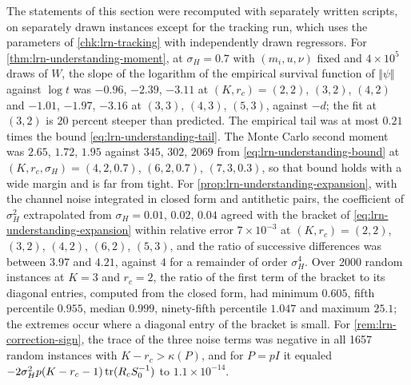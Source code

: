 \begin{numcheck}\label{chk:lrn-independent}
The statements of this section were recomputed with separately written scripts, on separately drawn instances except for the tracking run, which uses the parameters of \cref{chk:lrn-tracking} with independently drawn regressors. For \cref{thm:lrn-understanding-moment}, at $\sigma_H=0.7$ with $(m_i,u,\nu)$ fixed and $4\times10^5$ draws of $W$, the slope of the logarithm of the empirical survival function of $\Vert\psi\Vert$ against $\log t$ was $-0.96$, $-2.39$, $-3.11$ at $(K,r_c)=(2,2)$, $(3,2)$, $(4,2)$ and $-1.01$, $-1.97$, $-3.16$ at $(3,3)$, $(4,3)$, $(5,3)$, against $-d$; the fit at $(3,2)$ is $20$ percent steeper than predicted. The empirical tail was at most $0.21$ times the bound \cref{eq:lrn-understanding-tail}. The Monte Carlo second moment was $2.65$, $1.72$, $1.95$ against $345$, $302$, $2069$ from \cref{eq:lrn-understanding-bound} at $(K,r_c,\sigma_H)=(4,2,0.7)$, $(6,2,0.7)$, $(7,3,0.3)$, so that bound holds with a wide margin and is far from tight. For \cref{prop:lrn-understanding-expansion}, with the channel noise integrated in closed form and antithetic pairs, the coefficient of $\sigma_H^2$ extrapolated from $\sigma_H=0.01$, $0.02$, $0.04$ agreed with the bracket of \cref{eq:lrn-understanding-expansion} within relative error $7\times10^{-3}$ at $(K,r_c)=(2,2)$, $(3,2)$, $(4,2)$, $(6,2)$, $(5,3)$, and the ratio of successive differences was between $3.97$ and $4.21$, against $4$ for a remainder of order $\sigma_H^4$. Over 2000 random instances at $K=3$ and $r_c=2$, the ratio of the first term of the bracket to its diagonal entries, computed from the closed form, had minimum $0.605$, fifth percentile $0.955$, median $0.999$, ninety-fifth percentile $1.047$ and maximum $25.1$; the extremes occur where a diagonal entry of the bracket is small. For \cref{rem:lrn-correction-sign}, the trace of the three noise terms was negative in all 1657 random instances with $K-r_c>\kappa(P)$, and for $P=pI$ it equaled $-2\sigma_H^2p(K-r_c-1)\operatorname{tr}(R_cS_0^{-1})$ to $1.1\times10^{-14}$.


\end{numcheck}
